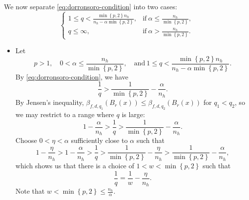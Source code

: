 \documentclass[11pt,reqno]{amsart}
\newcommand{\1}{\mathbf 1}
\begin{document}
We now separate \eqref{eq:dorronsoro-condition} into two cases:
\[
\begin{cases}
1\le q<\frac{\min\left\{p,2\right\}n_h}{n_h-\alpha\min\left\{p,2\right\}},& \mathrm{if~}\alpha\le \frac{n_h}{\min\left\{p,2\right\}},\\
    q\le \infty,& \mathrm{if~}\alpha> \frac{n_h}{\min\left\{p,2\right\}}.
\end{cases}
\]
\begin{itemize}
    \item[Case 1.]Let
    \[
p>1, \quad 0<\alpha\le \frac{n_h}{\min\left\{p,2\right\}}, \quad\mathrm{and}~ 1 \le q < \frac{\min\left\{p,2\right\}n_h}{n_h - \alpha\min\left\{p,2\right\}}.
\]
By \eqref{eq:dorronsoro-condition}, we have
\[
\frac 1q>\frac{1}{\min\left\{p,2\right\}}-\frac{\alpha}{n_h}.
\]
By Jensen's inequality, $\beta_{f,d,q_1}\left(B_r\left(x\right)\right)\le \beta_{f,d,q_2}\left(B_r\left(x\right)\right)$ for $q_1<q_2$, so we may restrict to a range where $q$ is large:
\[
1-\frac{\alpha}{n_h}>\frac 1q>\frac{1}{\min\left\{p,2\right\}}-\frac{\alpha}{n_h}.
\]
Choose $0<\eta<\alpha$ sufficiently close to $\alpha$ such that
\[
1-\frac{\eta}{n_h}>1-\frac{\alpha}{n_h}>\frac 1q>\frac{1}{\min\left\{p,2\right\}}-\frac{\eta}{n_h}>\frac{1}{\min\left\{p,2\right\}}-\frac{\alpha}{n_h},
\]
which shows us that there is a choice of $1<w<\min\left\{p,2\right\}$ such that
\[
\frac 1q=\frac 1w-\frac \eta {n_h}.
\]
Note that $w<\min\left\{p,2\right\}\le \frac {n_h}\alpha$.


\end{itemize}
\end{document}
